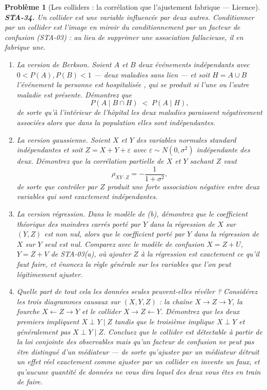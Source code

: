 \documentclass[11pt]{article}
\newtheorem{problem}{Problème}
\begin{document}
\bigskip

\begin{problem}[{Les colliders : la corrélation que l'ajustement fabrique --- Licence}]
\textbf{STA-34.} Un \textit{collider} est une variable influencée par deux autres. Conditionner
par un collider est l'image en miroir du conditionnement par un facteur de confusion (STA-03) : au
lieu de supprimer une association fallacieuse, il en fabrique une.
\begin{enumerate}
\item[(a)] La version de Berkson. Soient $ A $ et $ B $ deux événements indépendants avec
$ 0 < P(A), P(B) < 1 $ --- deux maladies sans lien --- et soit $ H = A \cup B $ l'événement
\og{} la personne est hospitalisée \fg{}, qui se produit si l'une ou l'autre maladie est présente.
Démontrez que
\[ P(A \mid B \cap H) \;<\; P(A \mid H) , \]
de sorte qu'à l'intérieur de l'hôpital les deux maladies paraissent négativement associées alors
que dans la population elles sont indépendantes.
\item[(b)] La version gaussienne. Soient $ X $ et $ Y $ des variables normales standard indépendantes
et soit $ Z = X + Y + \varepsilon $ avec $ \varepsilon \sim N(0, \sigma^2) $ indépendante des
deux. Démontrez que la corrélation partielle de $ X $ et $ Y $ sachant $ Z $ vaut
\[ \rho_{XY \cdot Z} = -\frac{1}{1 + \sigma^2} , \]
de sorte que \og{} contrôler par $ Z $ \fg{} produit une forte association négative entre deux variables
qui sont exactement indépendantes.
\item[(c)] La version régression. Dans le modèle de (b), démontrez que le coefficient théorique des
moindres carrés porté par $ Y $ dans la régression de $ X $ sur $ (Y, Z) $ est non nul, alors
que le coefficient porté par $ Y $ dans la régression de $ X $ sur $ Y $ seul est nul.
Comparez avec le modèle de confusion $ X = Z + U $, $ Y = Z + V $ de STA-03(a), où ajouter
$ Z $ à la régression est exactement ce qu'il faut faire, et énoncez la règle générale sur les
variables que l'on peut légitimement ajuster.
\item[(d)] Quelle part de tout cela les données seules peuvent-elles révéler ? Considérez les trois
diagrammes causaux sur $ (X, Y, Z) $ : la chaîne $ X \to Z \to Y $, la fourche
$ X \leftarrow Z \rightarrow Y $ et le collider $ X \to Z \leftarrow Y $. Démontrez que les deux
premiers impliquent $ X \perp Y \mid Z $ tandis que le troisième implique $ X \perp Y $ et
généralement pas $ X \perp Y \mid Z $. Concluez que le collider est détectable à partir de la loi
conjointe des observables mais qu'un facteur de confusion ne peut pas être distingué d'un
médiateur --- de sorte qu'ajuster par un médiateur détruit un effet réel exactement comme ajuster par
un collider en invente un faux, et qu'aucune quantité de données ne vous dira lequel des deux vous
êtes en train de faire.
\end{enumerate}

\end{problem}
\end{document}

